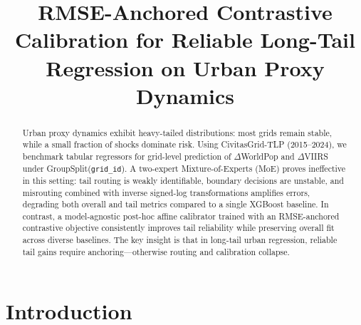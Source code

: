\documentclass[11pt,conference,onecolumn]{IEEEtran}
\begin{document}
\newcommand{\bst}{\rlap{$^{*}$}}



\title{RMSE-Anchored Contrastive Calibration for Reliable Long-Tail Regression on Urban Proxy Dynamics}

\author{
}

\maketitle

\begin{abstract}
Urban proxy dynamics exhibit heavy-tailed distributions: most grids remain stable, while a small fraction of shocks dominate risk. Using CivitasGrid-TLP (2015–2024), we benchmark tabular regressors for grid-level prediction of $\Delta$WorldPop and $\Delta$VIIRS under GroupSplit(\texttt{grid\_id}). A two-expert Mixture-of-Experts (MoE) proves ineffective in this setting: tail routing is weakly identifiable, boundary decisions are unstable, and misrouting combined with inverse signed-log transformations amplifies errors, degrading both overall and tail metrics compared to a single XGBoost baseline. In contrast, a model-agnostic post-hoc affine calibrator trained with an RMSE-anchored contrastive objective consistently improves tail reliability while preserving overall fit across diverse baselines. The key insight is that in long-tail urban regression, reliable tail gains require anchoring—otherwise routing and calibration collapse.
\end{abstract}





\section{Introduction}
\end{document}
